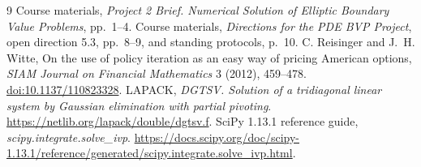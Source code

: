 \documentclass[11pt,a4paper]{article}
\numberwithin{equation}{section}
\begin{document}
\begin{thebibliography}{9}
\small
{}
Course materials, \emph{Project 2 Brief. Numerical Solution of Elliptic
Boundary Value Problems}, pp.~1--4.
Course materials, \emph{Directions for the PDE BVP Project}, open direction
5.3, pp.~8--9, and standing protocols, p.~10.
C. Reisinger and J.~H. Witte, On the use of policy iteration as an easy
way of pricing American options, \emph{SIAM Journal on Financial
Mathematics} 3 (2012), 459--478.
\href{https://doi.org/10.1137/110823328}{doi:10.1137/110823328}.
LAPACK, \emph{DGTSV. Solution of a tridiagonal linear system by Gaussian
elimination with partial pivoting}.
\url{https://netlib.org/lapack/double/dgtsv.f}.
SciPy 1.13.1 reference guide, \emph{scipy.integrate.solve\_ivp}.
\url{https://docs.scipy.org/doc/scipy-1.13.1/reference/generated/scipy.integrate.solve_ivp.html}.
\end{thebibliography}
\end{document}
